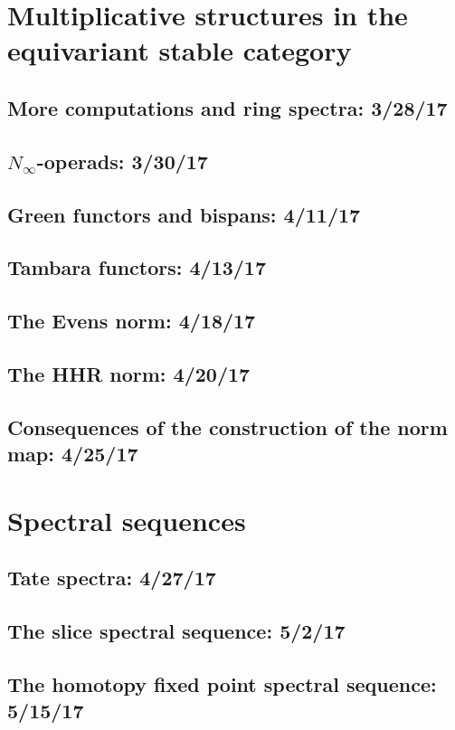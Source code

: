 \documentclass[openany]{style_EHT}
\begin{document}
\chapter{Multiplicative structures in the equivariant stable category}
\section{More computations and ring spectra: 3/28/17}
	
\section{$N_\infty$-operads: 3/30/17}
	
\section{Green functors and bispans: 4/11/17}
	
\section{Tambara functors: 4/13/17}
	
\section{The Evens norm: 4/18/17}
	
\section{The HHR norm: 4/20/17}
	
\section{Consequences of the construction of the norm map: 4/25/17}
	

\chapter{Spectral sequences}
\section{Tate spectra: 4/27/17}
	
\section{The slice spectral sequence: 5/2/17}
	
\section{The homotopy fixed point spectral sequence: 5/15/17}
	

\backmatter

\clearpage
{}
{}

\end{document}
